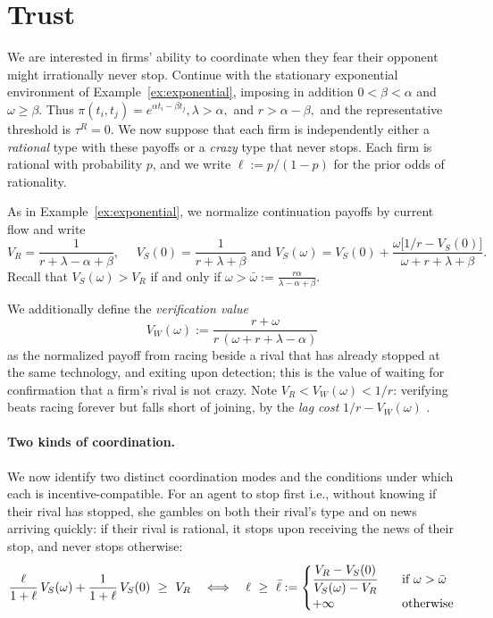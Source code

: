 \documentclass[12pt,reqno]{article}
\theoremstyle{definition} \newtheorem{example}{Example}
\theoremstyle{definition} \newtheorem{condition}{Condition}
\theoremstyle{definition} \newtheorem{corollary}{Corollary}
\theoremstyle{definition} \newtheorem{claim}{Claim}
\theoremstyle{definition} \newtheorem{definition}{Definition}
\theoremstyle{definition} \newtheorem{conjecture}{Conjecture}
\theoremstyle{definition} \newtheorem{Lemma}{Lemma}
\theoremstyle{definition} \newtheorem{lemma}{Lemma}
\theoremstyle{plain} \newtheorem{theorem}{Theorem}
\theoremstyle{definition} \newtheorem{assumption}{Assumption}
\theoremstyle{definition} \newtheorem*{assumptionnonumber}{Assumption}
\theoremstyle{definition} \newtheorem*{theoremNoNumber}{Proposition}
\theoremstyle{definition}
\theoremstyle{definition}\newtheorem{proposition}{Proposition}
\theoremstyle{definition} \newtheorem{result}{Result}
\theoremstyle{definition} \newtheorem*{definitionNoNumber}{Definition}
\theoremstyle{definition} \newtheorem{Definition}{Definition}
\theoremstyle{definition} \newtheorem*{DefinitionNoNumber}{Definition}
\theoremstyle{definition} \newtheorem*{fact}{Fact}
\theoremstyle{definition} \newtheorem*{property}{Property}
\theoremstyle{definition} \newtheorem{remark}{Remark}
\begin{document}

\section{Trust} \label{sec:trust}
We are interested in firms' ability to coordinate when they fear their opponent might irrationally never stop. Continue with the stationary exponential environment of Example~\ref{ex:exponential}, imposing in addition $0<\beta<\alpha$ and $\omega\ge\beta$. Thus
$
\pi(t_i,t_j)=e^{\alpha t_i-\beta t_j},
\lambda>\alpha,$ and $
r>\alpha-\beta,$ 
and the representative threshold is $\tau^R=0$. We now suppose that each firm is independently either a \emph{rational} type with these payoffs or a \emph{crazy} type that never stops. Each firm is rational with probability $p$, and we write $\ell:=p/(1-p)$ for the prior odds of rationality.

As in Example~\ref{ex:exponential}, we normalize continuation payoffs by current flow and write
\[
V_R=\frac{1}{r+\lambda-\alpha+\beta},\text{  }
\text{  }
V_S(0)=\frac{1}{r+\lambda+\beta} \text{  and }
V_S(\omega)=
V_S(0)+
\frac{\omega\bigl[1/r-V_S(0)\bigr]}
{\omega+r+\lambda+\beta}.
\]
Recall that $V_S(\omega)>V_R$ if and only if
$
\omega>\bar\omega
:=
\frac{r\alpha}{\lambda-\alpha+\beta}.$

We additionally define the \emph{verification value}
\[
V_W(\omega):=\frac{r+\omega}{r\,(\omega+r+\lambda-\alpha)}
\]
as the normalized payoff from racing beside a rival that has already stopped at the same technology, and exiting upon detection; this is the value of waiting for confirmation that a firm's rival is not crazy. Note $V_R<V_W(\omega)<1/r$: verifying beats racing forever but falls short of joining, by the \emph{lag cost} $1/r-V_W(\omega)$ .

\paragraph{Two kinds of coordination.} We now identify two distinct coordination modes and the conditions under which each is incentive-compatible. For an agent to stop first i.e., without knowing if their rival has stopped, she gambles on both their rival's type and on news arriving quickly: if their rival is rational, it stops upon receiving the news of their stop, and never stops otherwise:
\[
\frac{\ell}{1+\ell}\,V_S(\omega)+\frac{1}{1+\ell}\,V_S(0)\ \ge\ V_R
\quad\Longleftrightarrow\quad
\ell\ \ge\ \bar\ell:= \begin{cases}
    \cfrac{V_R-V_S(0)}{V_S(\omega)-V_R} \quad &\text{if $\omega > \bar \omega$} \\ 
    +\infty &\text{otherwise}
\end{cases}
\]
\end{document}
